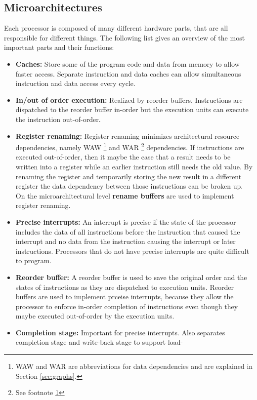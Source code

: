 \documentclass[a4paper,10pt]{article}
\begin{document}
\subsection{Microarchitectures}
Each processor is composed of many different hardware parts, that are all responsible for different things. The following list gives an 
overview of the most important parts and their functions:
\begin{itemize}
 \item \textbf{Caches:} Store some of the program code and data from memory to allow faster access. Separate instruction and data caches 
       can allow simultaneous instruction and data access every cycle.
 \item \textbf{In/out of order execution:} Realized by reorder buffers. Instructions are dispatched to the reorder buffer in-order but 
       the execution units can execute the instruction out-of-order.
 \item \textbf{Register renaming:} Register renaming minimizes architectural resource dependencies, namely WAW
       \footnote{\label{footnote-waw}WAW and WAR are abbreviations for data dependencies and are explained in Section \ref{sec:graphs}.} 
       and WAR \footnote{See footnote \ref{footnote-waw}} dependencies. If instructions are executed out-of-order, then it maybe the case 
       that a result needs to be written into a register while an earlier instruction still needs the old value. By renaming the register 
       and temporarily storing the new result in a different register the data dependency between those instructions can be broken up. On 
       the microarchitectural level \textbf{rename buffers} are used to implement register renaming.
 \item \textbf{Precise interrupts:} An interrupt is precise if the state of the processor includes the data of all instructions before 
       the instruction that caused the interrupt and no data from the instruction causing the interrupt or later instructions. Processors 
       that do not have precise interrupts are quite difficult to program.
 \item \textbf{Reorder buffer:} A reorder buffer is used to save the original order and the states of instructions as they are dispatched 
       to execution units. Reorder buffers are used to implement prceise interrupts, because they allow the processor to enforce in-order 
       completion of instructions even though they maybe executed out-of-order by the execution units.
 \item \textbf{Completion stage:} Important for precise interrupts. Also separates completion stage and write-back stage to support load-

\end{itemize}
\end{document}
